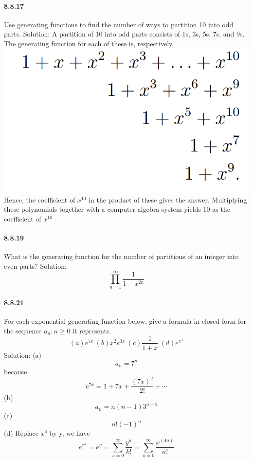 \documentclass{article}
\begin{document}
\paragraph{8.8.17}
Use generating functions to find the number of ways to partition 10 into odd parts.\newline
Solution:\newline
A partition of 10 into odd parts consists of 1s, 3s, 5s, 7s, and 9s. The generating function for
each of these is, respectively,\newline
\includegraphics{0042}\newline
Hence, the coefficient of $x^10$ in the product of these gives the answer. Multiplying these
polynomials together with a computer algebra system yields 10 as the coefficient of $x^10$
\paragraph{8.8.19}
What is the generating function for the number of partitions of an integer into even parts?\newline
Solution:\newline
$$\prod_{n=1}^{\infty}\frac{1}{1-x^{2n}}$$
\paragraph{8.8.21}
For each exponential generating function below, give a formula in closed form for the sequence ${a_n:n\ge 0}$ it represents.
$$(a) e^{7x}\ (b)x^2e^{3x}\ (c)\frac{1}{1+x}\ (d)e^{x^4}$$
Solution:\newline
(a) $$a_n=7^n$$ because
$$e^{7x}=1+7x+\frac{(7x)^2}{2!}+\cdots$$
(b) $$a_n=n(n-1)3^{n-2}$$
(c) $$n!(-1)^n$$
(d) Replace $x^4$ by y, we have 
$$e^{x^4}=e^y=\sum_{n=0}^{\infty}\frac{y^n}{k!}=\sum_{n=0}^{\infty}\frac{x^{(4n)}}{n!}$$
\end{document}
